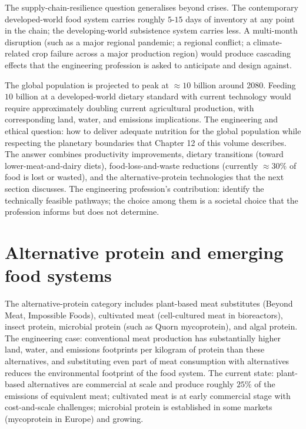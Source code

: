 The supply-chain-resilience question generalises beyond crises. The contemporary developed-world food system carries roughly $5$-$15$ days of inventory at any point in the chain; the developing-world subsistence system carries less. A multi-month disruption (such as a major regional pandemic; a regional conflict; a climate-related crop failure across a major production region) would produce cascading effects that the engineering profession is asked to anticipate and design against.

\begin{archetype}
The global population is projected to peak at $\approx 10$ billion around 2080. Feeding $10$ billion at a developed-world dietary standard with current technology would require approximately doubling current agricultural production, with corresponding land, water, and emissions implications. The engineering and ethical question: how to deliver adequate nutrition for the global population while respecting the planetary boundaries that Chapter 12 of this volume describes. The answer combines productivity improvements, dietary transitions (toward lower-meat-and-dairy diets), food-loss-and-waste reductions (currently $\approx 30\%$ of food is lost or wasted), and the alternative-protein technologies that the next section discusses. The engineering profession's contribution: identify the technically feasible pathways; the choice among them is a societal choice that the profession informs but does not determine.
\end{archetype}

\section{Alternative protein and emerging food systems}

The alternative-protein category includes plant-based meat substitutes (Beyond Meat, Impossible Foods), cultivated meat (cell-cultured meat in bioreactors), insect protein, microbial protein (such as Quorn mycoprotein), and algal protein. The engineering case: conventional meat production has substantially higher land, water, and emissions footprints per kilogram of protein than these alternatives, and substituting even part of meat consumption with alternatives reduces the environmental footprint of the food system. The current state: plant-based alternatives are commercial at scale and produce roughly $25\%$ of the emissions of equivalent meat; cultivated meat is at early commercial stage with cost-and-scale challenges; microbial protein is established in some markets (mycoprotein in Europe) and growing.

